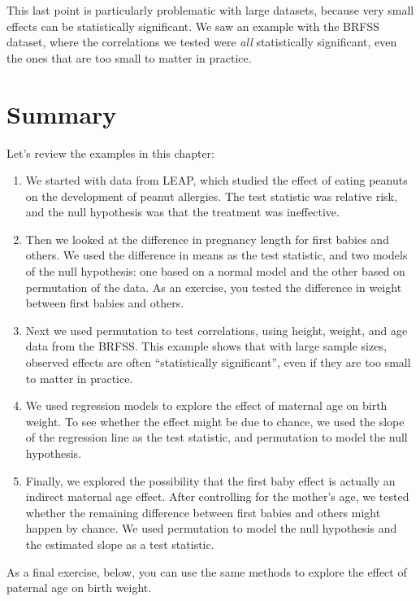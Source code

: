 This last point is particularly problematic with large datasets, because
very small effects can be statistically significant. We saw an example
with the BRFSS dataset, where the correlations we tested were \emph{all}
statistically significant, even the ones that are too small to matter in
practice.

\section{Summary}\label{summary}

Let's review the examples in this chapter:

\begin{enumerate}
\def\labelenumi{\arabic{enumi}.}
\item
  We started with data from LEAP, which studied the effect of eating
  peanuts on the development of peanut allergies. The test statistic was
  relative risk, and the null hypothesis was that the treatment was
  ineffective.
\item
  Then we looked at the difference in pregnancy length for first babies
  and others. We used the difference in means as the test statistic, and
  two models of the null hypothesis: one based on a normal model and the
  other based on permutation of the data. As an exercise, you tested the
  difference in weight between first babies and others.
\item
  Next we used permutation to test correlations, using height, weight,
  and age data from the BRFSS. This example shows that with large sample
  sizes, observed effects are often ``statistically significant'', even
  if they are too small to matter in practice.
\item
  We used regression models to explore the effect of maternal age on
  birth weight. To see whether the effect might be due to chance, we
  used the slope of the regression line as the test statistic, and
  permutation to model the null hypothesis.
\item
  Finally, we explored the possibility that the first baby effect is
  actually an indirect maternal age effect. After controlling for the
  mother's age, we tested whether the remaining difference between first
  babies and others might happen by chance. We used permutation to model
  the null hypothesis and the estimated slope as a test statistic.
\end{enumerate}

As a final exercise, below, you can use the same methods to explore the
effect of paternal age on birth weight.

